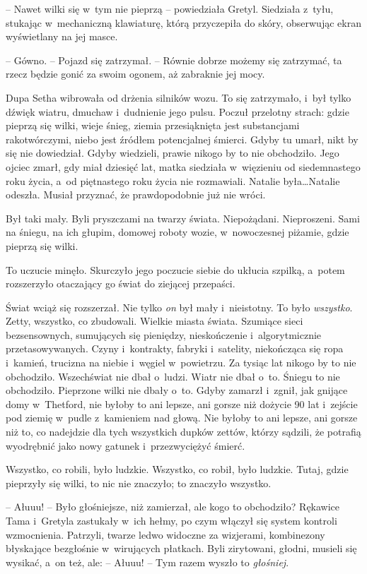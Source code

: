 \documentclass[oneside,polish,11pt,sfheadings]{mwbk}
\begin{document}
-- Nawet wilki się w~tym nie pieprzą -- powiedziała Gretyl. Siedziała z~tyłu, stukając w~mechaniczną klawiaturę, którą przyczepiła do skóry,
obserwując ekran wyświetlany na jej masce. 

-- Gówno. -- Pojazd się
zatrzymał. -- Równie dobrze możemy się zatrzymać, ta rzecz będzie gonić
za swoim ogonem, aż zabraknie jej mocy.

Dupa Setha wibrowała od drżenia silników wozu. To się zatrzymało, i~był
tylko dźwięk wiatru, dmuchaw i~dudnienie jego pulsu. Poczuł przelotny
strach: gdzie pieprzą się wilki, wieje śnieg, ziemia przesiąknięta jest
substancjami rakotwórczymi, niebo jest źródłem potencjalnej śmierci.
Gdyby tu umarł, nikt by się nie dowiedział. Gdyby wiedzieli, prawie
nikogo by to nie obchodziło. Jego ojciec zmarł, gdy miał dziesięć lat,
matka siedziała w~więzieniu od siedemnastego roku życia, a~od
piętnastego roku życia nie rozmawiali. Natalie była\ldots  Natalie odeszła.
Musiał przyznać, że prawdopodobnie już nie wróci.

Był taki mały. Byli pryszczami na twarzy świata. Niepożądani.
Nieproszeni. Sami na śniegu, na ich głupim, domowej roboty wozie, w~nowoczesnej piżamie, gdzie pieprzą się wilki.

To uczucie minęło. Skurczyło jego poczucie siebie do ukłucia szpilką, a~potem rozszerzyło otaczający go świat do ziejącej przepaści.

Świat wciąż się rozszerzał. Nie tylko \textit{on }był mały i~nieistotny.
To było \textit{wszystko}. Zetty, wszystko, co zbudowali. Wielkie miasta
świata. Szumiące sieci bezsensownych, sumujących się pieniędzy,
nieskończenie i~algorytmicznie przetasowywanych. Czyny i~kontrakty,
fabryki i~satelity, niekończąca się ropa i~kamień, trucizna na niebie i~węgiel w~powietrzu. Za tysiąc lat nikogo by to nie obchodziło.
Wszechświat nie dbał o~ludzi. Wiatr nie dbał o~to. Śniegu to nie
obchodziło. Pieprzone wilki nie dbały o~to. Gdyby zamarzł i~zgnił, jak
gnijące domy w~Thetford, nie byłoby to ani lepsze, ani gorsze niż
dożycie 90 lat i~zejście pod ziemię w~pudle z~kamieniem nad głową. Nie
byłoby to ani lepsze, ani gorsze niż to, co nadejdzie dla tych
wszystkich dupków zettów, którzy sądzili, że potrafią wyodrębnić jako
nowy gatunek i~przezwyciężyć śmierć.

Wszystko, co robili, było ludzkie. Wszystko, co robił, było ludzkie.
Tutaj, gdzie pieprzyły się wilki, to nic nie znaczyło; to znaczyło
wszystko.

-- Ałuuu! -- Było głośniejsze, niż zamierzał, ale kogo to obchodziło?
Rękawice Tama i~Gretyla zastukały w~ich hełmy, po czym włączył się
system kontroli wzmocnienia. Patrzyli, twarze ledwo widoczne za
wizjerami, kombinezony błyskające bezgłośnie w~wirujących płatkach. Byli
zirytowani, głodni, musieli się wysikać, a~on też, ale: -- Ałuuu! -- Tym
razem wyszło to \textit{głośniej}.
\end{document}
